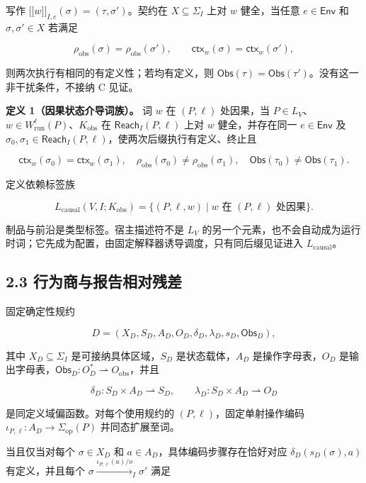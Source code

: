 \documentclass[
  11pt,
  a4paper,
]{ctexart}
\providecommand{\llbracket}{\mathopen{[\![}}
\providecommand{\rrbracket}{\mathclose{]\!]}}
\begin{document}
写作 \(\llbracket w\rrbracket_{I,e}(\sigma)=(\tau,\sigma')\)。契约在
\(X\subseteq\Sigma_I\) 上对 \(w\) 健全，当任意 \(e\in\mathsf{Env}\) 和
\(\sigma,\sigma'\in X\) 若满足

\[\rho_{\mathrm{obs}}(\sigma)=\rho_{\mathrm{obs}}(\sigma'),\qquad
\mathsf{ctx}_w(\sigma)=\mathsf{ctx}_w(\sigma'),\]

则两次执行有相同的有定义性；若均有定义，则
\(\mathsf{Obs}(\tau)=\mathsf{Obs}(\tau')\)。没有这一非干扰条件，不接纳 C
见证。

\textbf{定义 1（因果状态介导词族）。} 词 \(w\) 在 \((P,\ell)\)
处因果，当
\(P\in L_V\)、\(w\in W^\ell_{\mathrm{run}}(P)\)、\(K_{\mathrm{obs}}\) 在
\(\mathsf{Reach}_I(P,\ell)\) 上对 \(w\) 健全，并存在同一
\(e\in\mathsf{Env}\) 及
\(\sigma_0,\sigma_1\in\mathsf{Reach}_I(P,\ell)\)，使两次后缀执行有定义、终止且

\[
\mathsf{ctx}_w(\sigma_0)=\mathsf{ctx}_w(\sigma_1),\quad
\rho_{\mathrm{obs}}(\sigma_0)\ne\rho_{\mathrm{obs}}(\sigma_1),\quad
\mathsf{Obs}(\tau_0)\ne\mathsf{Obs}(\tau_1).
\]

定义依赖标签族

\[L_{\mathrm{causal}}(V,I;K_{\mathrm{obs}})=
\{(P,\ell,w)\mid w\text{ 在 }(P,\ell)\text{ 处因果}\}.\]

制品与前沿是类型标签。宿主描述符不是 \(L_V\)
的另一个元素，也不会自动成为运行时词；它先成为配置，由固定解释器诱导调度，只有同后缀见证进入
\(L_{\mathrm{causal}}\)。

\hypertarget{23-ux884cux4e3aux5546ux4e0eux62a5ux544aux76f8ux5bf9ux6b8bux5dee}{%
\subsection{2.3
行为商与报告相对残差}\label{23-ux884cux4e3aux5546ux4e0eux62a5ux544aux76f8ux5bf9ux6b8bux5dee}}

固定确定性规约

\[D=(X_D,S_D,A_D,O_D,\delta_D,\lambda_D,s_D,\mathsf{Obs}_D),\]

其中 \(X_D\subseteq\Sigma_I\) 是可接纳具体区域，\(S_D\)
是状态载体，\(A_D\) 是操作字母表，\(O_D\)
是输出字母表，\(\mathsf{Obs}_D:O_D^*\rightharpoonup O_{\mathrm{obs}}\)，并且

\[\delta_D:S_D\times A_D\rightharpoonup S_D,
\qquad\lambda_D:S_D\times A_D\rightharpoonup O_D\]

是同定义域偏函数。对每个使用规约的 \((P,\ell)\)，固定单射操作编码
\(\iota_{P,\ell}:A_D\to\Sigma_{\mathrm{op}}(P)\) 并同态扩展至词。

当且仅当对每个 \(\sigma\in X_D\) 和
\(a\in A_D\)，具体编码步骤存在恰好对应 \(\delta_D(s_D(\sigma),a)\)
有定义，并且每个 \(\sigma\xrightarrow{\iota_{P,\ell}(a)/o}_I\sigma'\)
满足
\end{document}
